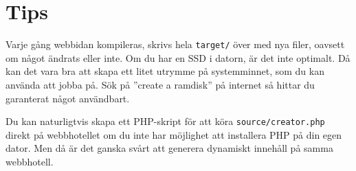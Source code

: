 \documentclass[a4paper,10pt]{article}
\begin{document}
\section{Tips}
Varje gång webbidan kompileras, skrivs hela {\tt target/} över med nya filer, oavsett om något ändrats eller inte. Om du har en SSD i datorn, är det inte optimalt. Då kan det vara bra att skapa ett litet utrymme på systemminnet, som du kan använda att jobba på. Sök på ''create a ramdisk'' på internet så hittar du garanterat något användbart. 

Du kan naturligtvis skapa ett PHP-skript för att köra {\tt source/creator.php} direkt på webbhotellet om du inte har möjlighet att installera PHP på din egen dator. Men då är det ganska svårt att generera dynamiskt innehåll på samma webbhotell. 
\end{document}
